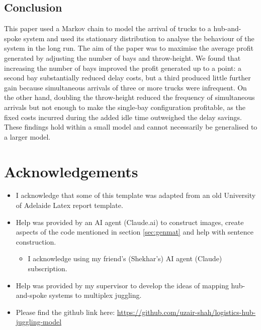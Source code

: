 \documentclass{article}
\theoremstyle{definition}
\theoremstyle{remark}
\numberwithin{equation}{section}
\newcommand{\RedComm}[1]{{\color{red}***#1***}}
\begin{document}
\subsection{Conclusion}

This paper used a Markov chain to model the arrival of trucks to a hub-and-spoke system and used its stationary distribution to analyse the behaviour of the system in the long run. The aim of the paper was to maximise the average profit generated by adjusting the number of bays and throw-height. We found that increasing the number of bays improved the profit generated up to a point: a second bay substantially reduced delay costs, but a third produced little further gain because simultaneous arrivals of three or more trucks were infrequent. On the other hand, doubling the throw-height reduced the frequency of simultaneous arrivals but not enough to make the single-bay configuration profitable, as the fixed costs incurred during the added idle time outweighed the delay savings. These findings hold within a small model and cannot necessarily be generalised to a larger model.


\section{Acknowledgements}
\begin{itemize}
\item I acknowledge that some of this template was adapted from an old University of Adelaide
Latex report template.
\item Help was provided by an AI agent (Claude.ai) to construct images, create aspects of the code mentioned in section \ref{sec:genmat} and help with sentence construction.
\begin{itemize}
    \item I acknowledge using my friend's (Shekhar's) AI agent (Claude) subscription. 
\end{itemize}
\item Help was provided by my supervisor to develop the ideas of mapping hub-and-spoke systems to multiplex juggling.
\item Please find the github link here: \url{https://github.com/uzair-shah/logistics-hub-juggling-model}
\end{itemize}
\end{document}
